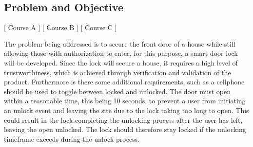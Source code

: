 \subsection{Problem and Objective}
[ Course A ] [ Course B ] [ Course C ] 
\newline
[ Casper ] [ Author B ] [ Author C ] 
\newline






The problem being addressed is to secure the front door of a house while still allowing those with authorization to enter, for this purpose, a smart door lock will be developed. Since the lock will secure a house, it requires a high level of trustworthiness, which is achieved through verification and validation of the product. Furthermore is there some additional requirements, such as a cellphone should be used to toggle between locked and unlocked. The door must open within a reasonable time, this being 10 seconds, to prevent a user from initiating an unlock event and leaving the site due to the lock taking too long to open. This could result in the lock completing the unlocking process after the user has left, leaving the open unlocked. The lock should therefore stay locked if the unlocking timeframe exceeds during the unlock process.